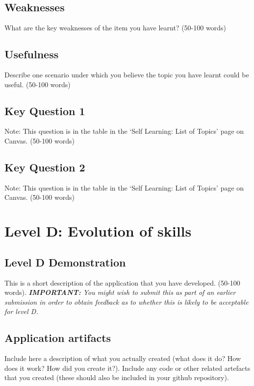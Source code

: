 \documentclass[a4paper, 11pt]{report}
\begin{document}
\subsection{Weaknesses}
What are the key weaknesses of the item you have learnt? (50-100 words)

\subsection{Usefulness}
Describe one scenario under which you believe the topic you have learnt could be useful. (50-100 words)

\subsection{Key Question 1}
Note: This question is in the table in the ‘Self Learning: List of Topics’ page on Canvas. (50-100 words)

\subsection{Key Question 2}
Note: This question is in the table in the ‘Self Learning: List of Topics’ page on Canvas. (50-100 words)



\newpage
\section{Level D: Evolution of skills}
\vspace{5mm}
\subsection{Level D Demonstration}

This is a short description of the application that you have developed. (50-100 words).
\textit{{\bf IMPORTANT:} You might wish to submit this as part of an earlier submission in order to obtain feedback as to whether this is likely to be acceptable for level D.}

\subsection{Application artifacts}

Include here a description of what you actually created (what does it do? How does it work? How did you create it?). Include any code or other related artefacts that you created (these should also be included in your github repository).
\end{document}
